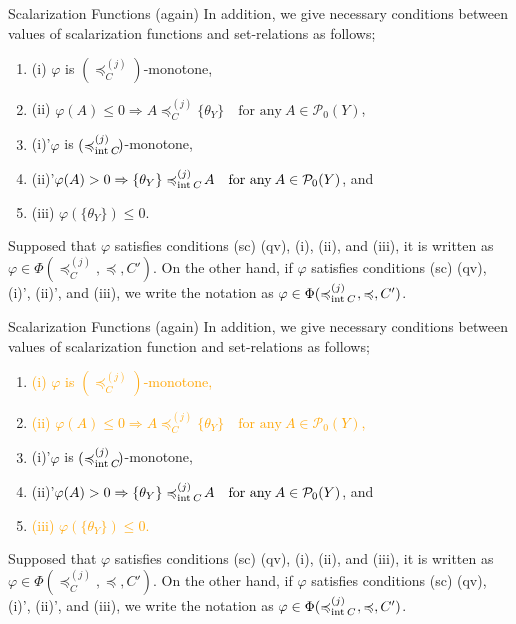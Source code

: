 \documentclass[aspectratio=169, dvipdfmx, 11pt]{beamer}
\newcommand{\Interior}[1]{\text{\rm int\:${#1}$}} %
\newcommand{\pow}[1]{\mathcal{P}_{0}(#1)}
\newcommand{\setrel}[2]{\preccurlyeq^{(#1)}_{#2}\!}
\begin{document}
\begin{frame}{Scalarization Functions (again)}
  In addition, we give necessary conditions between values of
  scalarization functions and set-relations as follows;
  \begin{enumerate}[]
    \item (i) $\varphi$ is $(\setrel{j}{C})$-monotone,
    \item (ii) $\varphi (A) \leq 0 \Rightarrow  A \setrel{j}{C} \{\theta_Y\}\quad\text{for any}\:A\in \pow{Y}$,
    \item (i)'$\varphi$ is $(\setrel{j}{\Interior{C}})$-monotone,
    \item (ii)'$\varphi (A) > 0 \Rightarrow  \{\theta_Y\} \setrel{j}{\Interior{C}} A \quad\text{for any}\:A\in \pow{Y}$, and
    \item (iii) $\varphi(\{\theta_{Y}\}) \leq 0$.
  \end{enumerate}
  Supposed that $\varphi$ satisfies conditions (sc) (qv), (i), (ii), and (iii),
  it is written as $\varphi \in \Phi(\setrel{j}{C}, \preccurlyeq, C')$. On the other hand,
  if $\varphi$ satisfies conditions (sc) (qv), (i)', (ii)', and (iii),
  we write the notation as $\varphi \in \Phi(\setrel{j}{\Interior{C}}\:, \preccurlyeq, C')$.
\end{frame}

\begin{frame}{Scalarization Functions (again)}
  In addition, we give necessary conditions between values of
  scalarization function and set-relations as follows;
  \begin{enumerate}[]
    \item \textcolor{orange}{(i) $\varphi$ is $(\setrel{j}{C})$-monotone,}
    \item \textcolor{orange}{(ii) $\varphi (A) \leq 0 \Rightarrow  A \setrel{j}{C} \{\theta_Y\}\quad\text{for any}\:A\in \pow{Y}$,}
    \item (i)'$\varphi$ is $(\setrel{j}{\Interior{C}})$-monotone,
    \item (ii)'$\varphi (A) > 0 \Rightarrow  \{\theta_Y\} \setrel{j}{\Interior{C}} A \quad\text{for any}\:A\in \pow{Y}$, and
    \item \textcolor{orange}{(iii) $\varphi(\{\theta_{Y}\}) \leq 0$.}
  \end{enumerate}
  Supposed that $\varphi$ satisfies conditions (sc) (qv), (i), (ii), and (iii),
  it is written as $\varphi \in \Phi(\setrel{j}{C}, \preccurlyeq, C')$. On the other hand,
  if $\varphi$ satisfies conditions (sc) (qv), (i)', (ii)', and (iii),
  we write the notation as $\varphi \in \Phi(\setrel{j}{\Interior{C}}\:, \preccurlyeq, C')$.
\end{frame}
\end{document}
